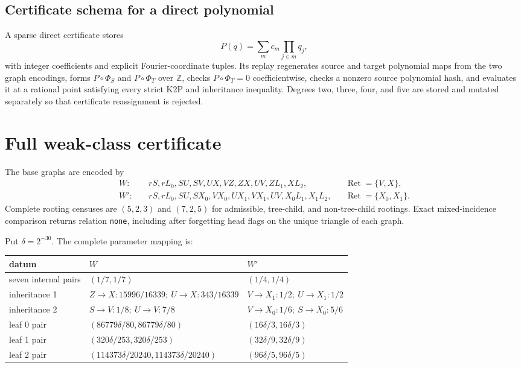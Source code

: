 \documentclass[11pt]{article}
\theoremstyle{remark}
\begin{document}
\subsection{Certificate schema for a direct polynomial}

A sparse direct certificate stores
\[
 P(q)=\sum_{m}c_m\prod_{j\in m}q_j,
\]
with integer coefficients and explicit Fourier-coordinate tuples.  Its replay
regenerates source and target polynomial maps from the two graph encodings,
forms \(P\circ\Phi_S\) and \(P\circ\Phi_T\) over \(\mathbb Z\), checks
\(P\circ\Phi_T=0\) coefficientwise, checks a nonzero source polynomial hash,
and evaluates it at a rational point satisfying every strict K2P and
inheritance inequality.  Degrees two, three, four, and five are stored and
mutated separately so that certificate reassignment is rejected.



\section{Full weak-class certificate}\label{sec:sharpness}

The base graphs are encoded by
\begin{align*}
W:&\quad rS,rL_0,SU,SV,UX,VZ,ZX,UV,ZL_1,XL_2,
&&\operatorname{Ret}=\{V,X\},\\
W':&\quad rS,rL_0,SU,SX_0,VX_0,UX_1,VX_1,UV,X_0L_1,X_1L_2,
&&\operatorname{Ret}=\{X_0,X_1\}.
\end{align*}
Complete rooting censuses are \((5,2,3)\) and \((7,2,5)\) for admissible,
tree-child, and non-tree-child rootings.  Exact mixed-incidence comparison
returns relation \texttt{none}, including after forgetting head flags on the
unique triangle of each graph.

Put \(\delta=2^{-30}\).  The complete parameter mapping is:
\begin{center}
\small
\begin{tabular}{L{.18\linewidth}L{.35\linewidth}L{.35\linewidth}}
\toprule
datum & \(W\) & \(W'\)\\
\midrule
seven internal pairs
& \((1/7,1/7)\)
& \((1/4,1/4)\)\\
inheritance 1
& \(Z\to X:15996/16339;\ U\to X:343/16339\)
& \(V\to X_1:1/2;\ U\to X_1:1/2\)\\
inheritance 2
& \(S\to V:1/8;\ U\to V:7/8\)
& \(V\to X_0:1/6;\ S\to X_0:5/6\)\\
leaf 0 pair
& \((86779\delta/80,86779\delta/80)\)
& \((16\delta/3,16\delta/3)\)\\
leaf 1 pair
& \((320\delta/253,320\delta/253)\)
& \((32\delta/9,32\delta/9)\)\\
leaf 2 pair
& \((114373\delta/20240,114373\delta/20240)\)
& \((96\delta/5,96\delta/5)\)\\
\bottomrule
\end{tabular}
\end{center}
\end{document}
